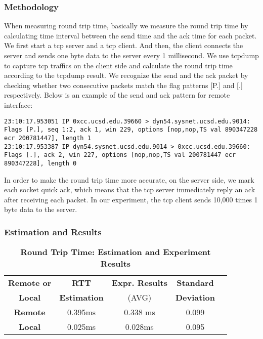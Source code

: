 \subsubsection{Methodology}

When measuring round trip time, basically we measure the round trip time by calculating time interval between the send time and the ack time for each packet. We first start a tcp server and a tcp client. And then, the client connects the server and sends one byte data to the server every 1 millisecond. We use tcpdump to capture tcp traffics on the client side and calculate the round trip time according to the tcpdump result.  We recognize the send and the ack packet by checking whether two consecutive packets match the flag patterns [P.] and [.] respectively. Below is an example of the send and ack pattern for remote interface:

\begin{lstlisting}
23:10:17.953051 IP 0xcc.ucsd.edu.39660 > dyn54.sysnet.ucsd.edu.9014: Flags [P.], seq 1:2, ack 1, win 229, options [nop,nop,TS val 890347228 ecr 200781447], length 1
23:10:17.953387 IP dyn54.sysnet.ucsd.edu.9014 > 0xcc.ucsd.edu.39660: Flags [.], ack 2, win 227, options [nop,nop,TS val 200781447 ecr 890347228], length 0
\end{lstlisting}

In order to make the round trip time more accurate, on the server side, we mark each socket quick ack, which means that the tcp server immediately reply an ack after receiving each packet. In our experiment, the tcp client sends 10,000 times 1 byte data to the server.

\subsubsection{Estimation and Results}

\begin{table}[ht]
  \centering
  \caption{\textbf{Round Trip Time: Estimation and Experiment Results}}
  \begin{threeparttable}
  \begin{tabular}{ccccc}
  \hline
      \textbf{Remote or} & \textbf{RTT}   & \textbf{Expr. Results} & \textbf{Standard}\\
      \textbf{Local}   &  \textbf{Estimation}  & (AVG)   & \textbf{Deviation} \\
  \hline
      \textbf{Remote}  & 0.395ms & 0.338 ms & 0.099 \\
      \textbf{Local} & 0.025ms & 0.028ms & 0.095 \\
  \hline
  \end{tabular}
  \end{threeparttable}
  \label{round_trip_time_table}
\end{table}

